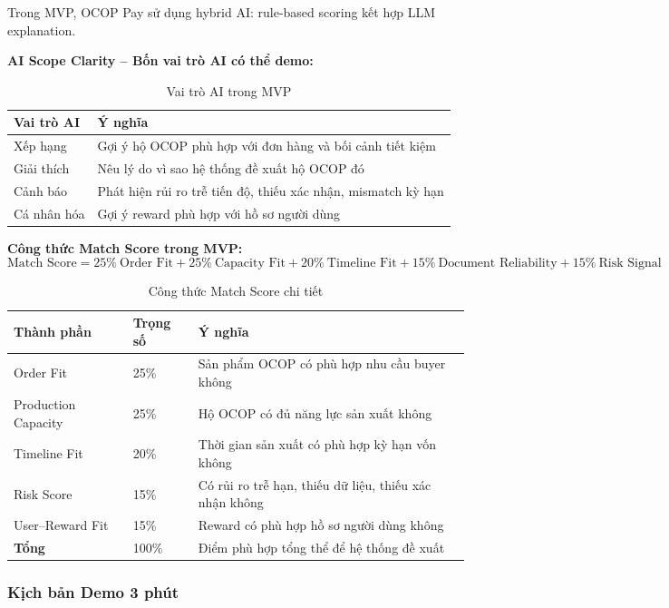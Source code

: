 \documentclass[13pt,a4paper]{extarticle}
\begin{document}
Trong MVP, OCOP Pay sử dụng hybrid AI: rule-based scoring kết hợp LLM explanation.

\textbf{AI Scope Clarity -- Bốn vai trò AI có thể demo:}

\begin{table}[H]
\centering
\caption{Vai trò AI trong MVP}
\begin{tabular}{|l|p{10cm}|}
\hline
\textbf{Vai trò AI} & \textbf{Ý nghĩa} \\
\hline
Xếp hạng & Gợi ý hộ OCOP phù hợp với đơn hàng và bối cảnh tiết kiệm \\
\hline
Giải thích & Nêu lý do vì sao hệ thống đề xuất hộ OCOP đó \\
\hline
Cảnh báo & Phát hiện rủi ro trễ tiến độ, thiếu xác nhận, mismatch kỳ hạn \\
\hline
Cá nhân hóa & Gợi ý reward phù hợp với hồ sơ người dùng \\
\hline
\end{tabular}
\end{table}

\textbf{Công thức Match Score trong MVP:}
\[
\text{Match Score} = 25\%\ \text{Order Fit} + 25\%\ \text{Capacity Fit} + 20\%\ \text{Timeline Fit} + 15\%\ \text{Document Reliability} + 15\%\ \text{Risk Signal}
\]

\begin{table}[H]
\centering
\caption{Công thức Match Score chi tiết}
\begin{tabular}{|p{3.5cm}|p{2cm}|p{8cm}|}
\hline
\textbf{Thành phần} & \textbf{Trọng số} & \textbf{Ý nghĩa} \\
\hline
Order Fit & 25\% & Sản phẩm OCOP có phù hợp nhu cầu buyer không \\
\hline
Production Capacity & 25\% & Hộ OCOP có đủ năng lực sản xuất không \\
\hline
Timeline Fit & 20\% & Thời gian sản xuất có phù hợp kỳ hạn vốn không \\
\hline
Risk Score & 15\% & Có rủi ro trễ hạn, thiếu dữ liệu, thiếu xác nhận không \\
\hline
User--Reward Fit & 15\% & Reward có phù hợp hồ sơ người dùng không \\
\hline
\textbf{Tổng} & 100\% & Điểm phù hợp tổng thể để hệ thống đề xuất \\
\hline
\end{tabular}
\end{table}

\subsubsection{Kịch bản Demo 3 phút}
\end{document}
